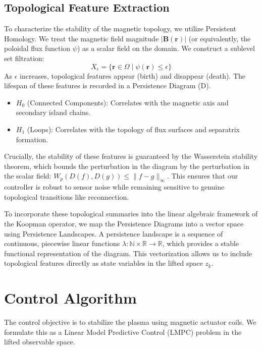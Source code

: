 \documentclass{article}
\begin{document}
\subsection{Topological Feature Extraction}
To characterize the stability of the magnetic topology, we utilize Persistent Homology. We treat the magnetic field magnitude $|\mathbf{B}(\mathbf{r})|$ (or equivalently, the poloidal flux function $\psi$) as a scalar field on the domain. We construct a sublevel set filtration:
\begin{equation}
    X_\epsilon = \{ \mathbf{r} \in \Omega \mid \psi(\mathbf{r}) \le \epsilon \}
\end{equation}
As $\epsilon$ increases, topological features appear (birth) and disappear (death). The lifespan of these features is recorded in a Persistence Diagram (D). 
\begin{itemize}
    \item $H_0$ (Connected Components): Correlates with the magnetic axis and secondary island chains.
    \item $H_1$ (Loops): Correlates with the topology of flux surfaces and separatrix formation.
\end{itemize}
Crucially, the stability of these features is guaranteed by the Wasserstein stability theorem, which bounds the perturbation in the diagram by the perturbation in the scalar field: $W_p(D(f), D(g)) \le \|f - g\|_\infty$. This ensures that our controller is robust to sensor noise while remaining sensitive to genuine topological transitions like reconnection.

To incorporate these topological summaries into the linear algebraic framework of the Koopman operator, we map the Persistence Diagrams into a vector space using Persistence Landscapes. A persistence landscape is a sequence of continuous, piecewise linear functions $\lambda : \mathbb{N} \times \mathbb{R} \to \mathbb{R}$, which provides a stable functional representation of the diagram. This vectorization allows us to include topological features directly as state variables in the lifted space $z_k$.

\section{Control Algorithm}
The control objective is to stabilize the plasma using magnetic actuator coils. We formulate this as a Linear Model Predictive Control (LMPC) problem in the lifted observable space.
\end{document}
